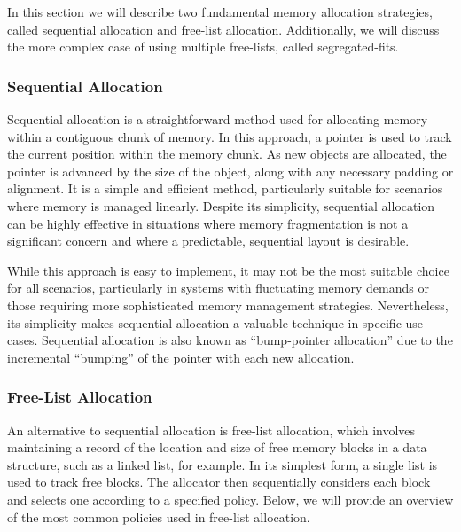 
In this section we will describe two fundamental memory allocation strategies, called sequential allocation and free-list allocation. Additionally, we will discuss the more complex case of using multiple free-lists, called segregated-fits.

\subsubsection{Sequential Allocation}
\label{sec:seq_allocation}
\label{sec:bump_pointer}

Sequential allocation is a straightforward method used for allocating memory within a contiguous chunk of memory. In this approach, a pointer is used to track the current position within the memory chunk. As new objects are allocated, the pointer is advanced by the size of the object, along with any necessary padding or alignment. It is a simple and efficient method, particularly suitable for scenarios where memory is managed linearly. Despite its simplicity, sequential allocation can be highly effective in situations where memory fragmentation is not a significant concern and where a predictable, sequential layout is desirable.

While this approach is easy to implement, it may not be the most suitable choice for all scenarios, particularly in systems with fluctuating memory demands or those requiring more sophisticated memory management strategies. Nevertheless, its simplicity makes sequential allocation a valuable technique in specific use cases. Sequential allocation is also known as ``bump-pointer allocation'' due to the incremental ``bumping'' of the pointer with each new allocation. 

\subsubsection{Free-List Allocation}
An alternative to sequential allocation is free-list allocation, which involves maintaining a record of the location and size of free memory blocks in a data structure, such as a linked list, for example. In its simplest form, a single list is used to track free blocks. The allocator then sequentially considers each block and selects one according to a specified policy. Below, we will provide an overview of the most common policies used in free-list allocation.

